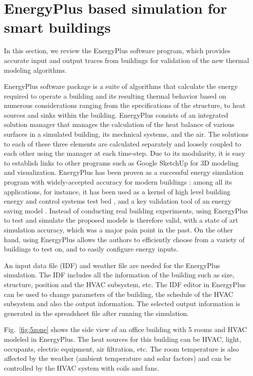 \section{EnergyPlus based simulation for smart buildings}
\label{sec:energy_plus_review}
\textcolor{feb18rev}{In this section, we review the EnergyPlus software program, which provides
accurate input and output traces from buildings for validation of the new
thermal modeling algorithms.}

EnergyPlus software package is a suite of algorithms that calculate the
energy required to operate a building and its resulting thermal behavior based
on numerous considerations ranging from the specifications of the structure, to
heat sources and sinks within the building. EnergyPlus consists of
an integrated solution manager that manages the calculation of the heat balance
of various surfaces in a simulated building, its mechnical systems, and the air.
The solutions to each of these three elements
are calculated separately and loosely coupled to each other using the manager at
each time-step. Due to its modularity, it is easy to establish links to other
programs such as Google SketchUp for 3D modeling and visualization.
\textcolor{feb18rev}{EnergyPlus has been proven as a successful energy
simulation program with widely-accepted accuracy for modern buildings
\cite{yang2016review}: among all its applications, for instance, it has been
used as a kernel of high level building energy and control systems test bed
\cite{wetter2011co}, and a key validation tool of an energy saving model
\cite{mardaljevic2009daylight}. Instead of conducting real building
experiments, using EnergyPlus to test and simulate the proposed models is
therefore valid, with a state of art simulation accuracy, which was a major
pain point in the past. On the other hand, using EnergyPlus allows the authors
to efficiently choose from a variety of buildings to test on, and to easily
configure energy inputs.}

An input data file (IDF) and weather file are needed for the EnergyPlus
simulation. The IDF includes all the information of the building such
as size, structure, position and the HVAC subsystem, etc. The IDF
editor in EnergyPlus can be used to change parameters of the building, the
schedule of the HVAC subsystem and also the output information. The
selected output information is generated in the spreadsheet file
after running the simulation.

Fig.~\ref{fig:5zone} shows the side view of an office building
with 5 rooms and HVAC modeled in EnergyPlus. The heat sources for this building
can be HVAC, light, occupants, electric equipment, air filtration, etc. The
room temperature is also affected by the weather (ambient temperature and solar
factors) and can be controlled by the HVAC system with coils
and fans.

